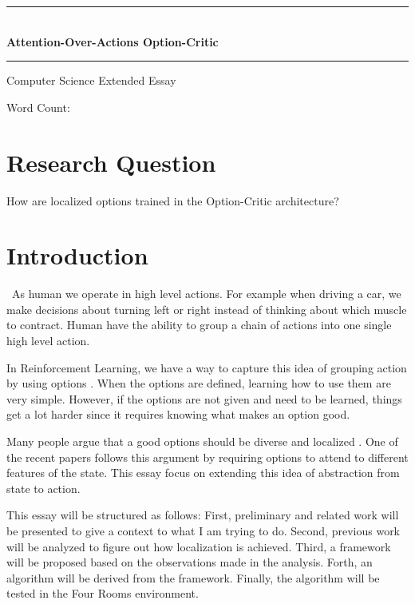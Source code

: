 \documentclass{article}
\date{}
\begin{document}
	\begin{center}
		\large{\rule{420pt}{0.4pt}}\\
		\vspace{0.15in}
		\LARGE{\bfseries{Attention-Over-Actions Option-Critic}}
		\vspace{0.1in}
		\large{\rule{420pt}{0.4pt}}
		
		\large{Computer Science Extended Essay}
		
		\normalsize{Word Count:}
	\end{center}
	\vspace{0.1in}
	\section*{Research Question}
	How are localized options trained in the Option-Critic architecture? \\
	\vspace{0.1in}
	\section{Introduction}
	\qquad \ As human we operate in high level actions. For example when driving a car, we make decisions about turning left or right instead of thinking about which muscle to contract. Human have the ability to group a chain of actions into one single high level action. 
	
	\quad In Reinforcement Learning, we have a way to capture this idea of grouping action by using options \cite{SUTTON1999181}. When the options are defined, learning how to use them are very simple. However, if the options are not given and need to be learned, things get a lot harder since it requires knowing what makes an option good. 

	\quad Many people argue that a good options should be diverse and localized \cite{khetarpal2020options}. One of the recent papers \cite{attentionoptioncritic} follows this argument by requiring options to attend to different features of the state. This essay focus on extending this idea of abstraction from state to action. 
	
	\quad This essay will be structured as follows: First, preliminary and related work will be presented to give a context to what I am trying to do. Second, previous work will be analyzed to figure out how localization is achieved. Third, a framework will be proposed based on the observations made in the analysis. Forth, an algorithm will be derived from the framework. Finally, the algorithm will be tested in the Four Rooms environment.
\end{document}
